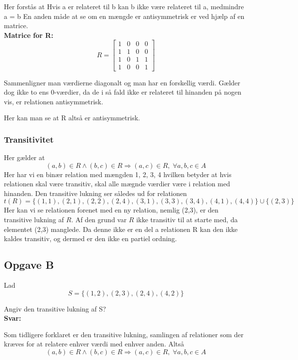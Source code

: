 \documentclass{article}
\begin{document}
Her forstås at  Hvis a er relateret til b kan b ikke være relateret til a, medmindre a = b
En anden måde at se om en mængde er antisymmetrisk er ved hjælp af en matrice.\\
\textbf{Matrice for R:}\\ 


\[R=\begin{bmatrix}
1 & 0 & 0 & 0\\
1 & 1 & 0 & 0\\
1 & 0 & 1 & 1\\
1 & 0 & 0 & 1
\end{bmatrix}\]


Sammenligner man værdierne diagonalt og man har en forskellig værdi. Gælder dog ikke to ens 0-værdier, da de i så fald ikke er relateret til hinanden på nogen vis, er relationen antisymmetrisk. 

Her kan man se at R altså er antisymmetrisk.

\subsubsection{Transitivitet}
Her gælder at \[(a,b)\in R \wedge (b,c)\in R \Rightarrow (a,c)\in R, \;  \forall a,b,c \in A\]
Her har vi en binær relation med mængden 1, 2, 3, 4 hvilken betyder at hvis relationen skal være transitiv, skal alle mægnde værdier være i relation med hinanden.
Den transitive lukning ser således ud for relationen \[t(R) = \{(1,1), (2,1), (2,2), (2,4), (3,1), (3,3), (3,4), (4,1), (4,4)\} \cup \{(2,3)\}\]
Her kan vi se relationen forenet med en ny relation, nemlig (2,3), er den transitive lukning af $R$. Af den grund var $R$ ikke transitiv til at starte med, da elementet (2,3) manglede. Da denne ikke er en del a relationen R kan den ikke kaldes transitiv, og dermed er den ikke en partiel ordning.

\vspace{0.5cm}


\subsection{Opgave B}
Lad \[S = \{(1, 2),(2, 3),(2, 4),(4, 2)\}\]


Angiv den transitive lukning af S?
\\\textbf{Svar:}


Som tidligere forklaret er den transitive lukning, samlingen af relationer som der kræves for at relatere enhver værdi med enhver anden. Altså \[(a,b)\in R \wedge (b,c)\in R \Rightarrow (a,c)\in R, \;  \forall a,b,c \in A\]
\end{document}
